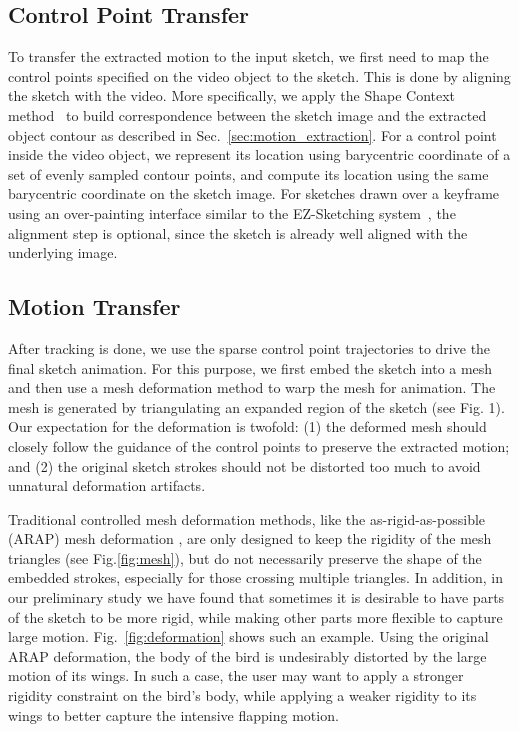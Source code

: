 \subsection{Control Point Transfer}\label{sec:cp_transfer}
To transfer the extracted motion to the input sketch, we first need to map the control points specified on the video object to the sketch. This is done by aligning the sketch with the video. More specifically, we apply the Shape Context method~\cite{belongie2000shape} to build correspondence between the sketch image and the extracted object contour as described in Sec.~\ref{sec:motion_extraction}. For a control point inside the video object, we represent its location using barycentric coordinate of a set of evenly sampled contour points, and compute its location using the same barycentric coordinate on the sketch image. 
For sketches drawn over a keyframe using an over-painting interface similar to the EZ-Sketching system~\cite{EZSketching:2014}, the alignment step is optional, since the sketch is already well aligned with the underlying image.

%


\subsection{Motion Transfer} \label{motion_transfer}

After tracking is done, we use the sparse control point trajectories to drive the final sketch animation. 
For this purpose, we first embed the sketch into a mesh and then use a mesh deformation method to warp the mesh for animation. The mesh is generated by
triangulating an expanded region of the sketch (see Fig. 1).
Our expectation for the deformation is twofold: 
(1) the deformed mesh should closely follow the guidance of the control points to preserve the extracted motion; 
and (2) the original sketch strokes should not be distorted too much to avoid unnatural deformation artifacts. 

Traditional controlled mesh deformation methods, like the as-rigid-as-possible (ARAP) mesh deformation \cite{Igarashi:2005}, are only designed to keep the rigidity of the mesh triangles (see Fig.\ref{fig:mesh}), but do not necessarily preserve the shape of the embedded strokes, 
especially for those crossing multiple triangles. In addition, in our preliminary study we have found that sometimes it is desirable to have parts of the sketch to be more rigid, while making other parts more flexible to capture large motion. 
Fig.~\ref{fig:deformation} shows such an example. 
Using the original ARAP deformation, the body of the bird is undesirably distorted by the large motion of its wings. 
In such a case, the user may want to apply a stronger rigidity constraint on the bird's body, while applying a weaker rigidity to its wings to better capture the intensive flapping motion.

